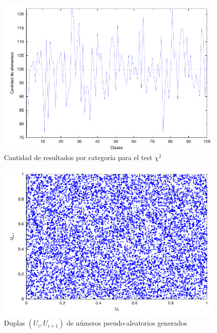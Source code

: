 \documentclass{sig-alternate}
\begin{document}
\begin{figure}[hp]
\centering
\includegraphics[scale=0.8]{graficos/clases}
\caption{Cantidad de resultados por categor\'{i}a para el test $\chi^{2}$}
\label{fig:clases}
\end{figure}

\begin{figure}[hp]
\centering
\includegraphics[scale=0.8]{graficos/duplas}
\caption{Duplas $(U_{i}, U_{i+1})$ de n\'{u}meros pseudo-aleatorios generados}
\label{fig:duplas}
\end{figure}
\end{document}
